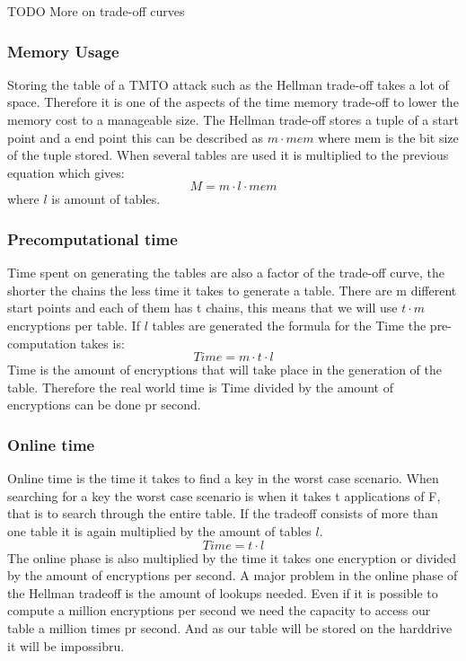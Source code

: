 TODO More on trade-off curves

\subsubsection{Memory Usage}
Storing the table of a TMTO attack such as the Hellman trade-off takes a lot of space. Therefore it is one of the aspects of the time memory trade-off to lower the memory cost to a manageable size. The Hellman trade-off stores a tuple of a start point and a end point this can be described as $m\cdot mem$ where mem is the bit size of the  tuple stored. When several tables are used it is multiplied to the previous equation which gives:
\begin{equation}
M=m\cdot l \cdot mem
\end{equation}
where $l$ is amount of tables.
\subsubsection{Precomputational time}
Time spent on generating the tables are also a factor of the trade-off
curve, the shorter the chains the less time it takes to generate a table. There are m different start points and each of them has t chains, this means that we will use $t\cdot m$ encryptions per table. If $l$ tables are generated the formula for the Time the pre-computation takes is:
\begin{equation}
  Time=m\cdot t\cdot l
\end{equation}
Time is the amount of encryptions that will take place in the generation of the table. Therefore the real world time is Time divided by the amount of encryptions can be done pr second.

\subsubsection{Online time}
Online time is the time it takes to find a key in the worst case scenario. When searching for a key the worst case scenario is when it takes t applications of F, that is to search through the entire table. If the tradeoff consists of more than one table it is again multiplied by the amount of tables $l$.
\begin{equation}
  Time=t\cdot l
\end{equation}
The online phase is also multiplied by the time it takes one encryption or divided by the amount of encryptions per second. A major problem in the online phase of the  Hellman tradeoff is the amount of lookups needed. Even if it is possible to compute a million encryptions per second we need the capacity to access our table a million times pr second. And as our table will be stored on the harddrive it will be impossibru.



